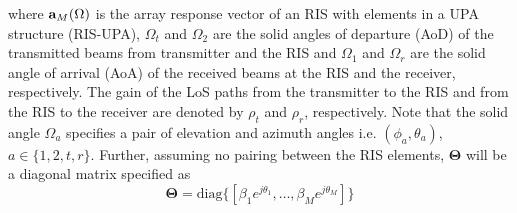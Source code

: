 \noindent
where ${\bf{a}}_M(\Omega)$ is the array response vector of an RIS with elements in a UPA structure (RIS-UPA), $\Omega_t$ and $\Omega_2$ are the solid angles of departure (AoD) of the transmitted beams from transmitter and the RIS and $\Omega_1$ and $\Omega_r$ are the solid angle of arrival (AoA) of the received beams at the RIS and the receiver, respectively. 
The gain of the LoS paths from the transmitter to the RIS and from the RIS to the receiver are denoted by $\rho_t$ and $\rho_r$, respectively. Note that the solid angle $\Omega_a$ specifies a pair of elevation and azimuth angles i.e. $(\phi_a, \theta_a)$, $a \in \{1,2, t, r\}$. Further, assuming no pairing between the RIS elements, $\boldsymbol\Theta$ will be a diagonal matrix specified as 
\begin{equation}
    \boldsymbol\Theta = \mbox{diag}\{[\beta_1 e^{j \theta_1}, \ldots, \beta_M e^{j \theta_M}]\}
\end{equation}

